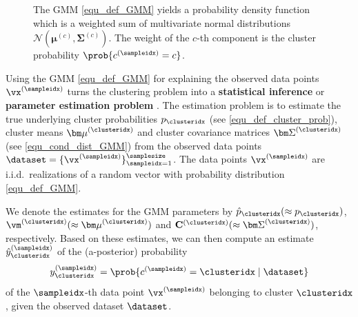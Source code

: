 \documentclass[12pt]{report}
\newcommand{\boundellipse}[3]%
{(#1) ellipse (#2 and #3)
}
\begin{document}
\begin{figure}
\begin{center}
\end{center}
\label{fig_GMM_elippses}
\caption{The GMM \eqref{equ_def_GMM} yields a probability 
	density function which is a weighted sum of multivariate 
	normal distributions $\mathcal{N}({\bm \mu}^{(c)}, {\bm \Sigma}^{(c)})$. 
    The weight of the $c$-th component is the cluster probability 
    $ \prob{c^{(\sampleidx)}=c}$.}
\end{figure}

Using the GMM \eqref{equ_def_GMM} for explaining the observed 
data points $\vx^{(\sampleidx)}$ turns the clustering problem into 
a {\bf statistical inference} or {\bf parameter estimation problem} \cite{kay,LC}. 
The estimation problem is to estimate the true underlying cluster 
probabilities $p_{\clusteridx}$ (see \eqref{equ_def_cluster_prob}), cluster 
means ${\bm \mu}^{(\clusteridx)}$ and cluster covariance matrices 
${\bm \Sigma}^{(\clusteridx)}$ (see \eqref{equ_cond_dist_GMM}) from 
the observed data points $\dataset = \{ \vx^{(\sampleidx)} \}_{\sampleidx=1}^{\samplesize}$. 
The data points $\vx^{(\sampleidx)}$ are i.i.d.\ realizations of a random vector with 
probability distribution \eqref{equ_def_GMM}. 

We denote the estimates for the GMM parameters by $\hat{p}_{\clusteridx} (\approx p_{\clusteridx})$, $\vm^{(\clusteridx)} (\approx {\bm \mu}^{(\clusteridx)})$ and 
$\mathbf{C}^{(\clusteridx)} (\approx {\bm \Sigma}^{(\clusteridx)})$, respectively. 
Based on these estimates, we can then compute an estimate $\hat{y}_{\clusteridx}^{(\sampleidx)}$ 
of the (a-posterior) probability 
\begin{equation} 
y_{\clusteridx}^{(\sampleidx)} = \prob{c^{(\sampleidx)} = \clusteridx \mid \dataset }
\end{equation} 
of the $\sampleidx$-th data point $\vx^{(\sampleidx)}$ belonging 
to cluster $\clusteridx$, given the observed dataset $\dataset$. 
\end{document}
